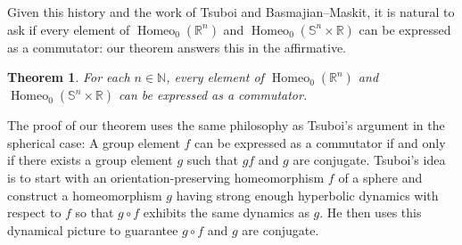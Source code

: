 \documentclass[microtype]{gtpart}
\newcommand{\br}{\mathbb{R}}
\newcommand{\bn}{\mathbb N}
\DeclareMathOperator{\Homeo}{Homeo}
\newtheorem*{MainThm1}{Theorem}
\newtheorem{Cor*}{Corollary}
\theoremstyle{definition}
\numberwithin{equation}{section}
\newcommand{\nv}[1]{\color{Cerulean}  \{NV: #1\}\color{black}}
\newcommand{\mb}[1]{\color{BrickRed} \{MB: #1\}\color{black}}
\begin{document}
Given this history and  the work of Tsuboi and Basmajian--Maskit, it is natural to ask if every element of \( \Homeo_0(\br^n) \) and \( \Homeo_0(\mathbb S^n \times \br) \) can be expressed as a commutator: our theorem answers this in the affirmative.

\begin{MainThm1}
For each \( n \in \bn \), every element of \( \Homeo_0(\mathbb R^n) \) and \( \Homeo_0(\mathbb S^n \times \br) \) can be expressed as a commutator. 
\end{MainThm1}

The proof of our theorem uses the same philosophy as Tsuboi's argument in the spherical case: 
A group element \( f \) can be expressed as a commutator if and only if there exists a group element \( g \) such that \( gf \) and \( g \) are conjugate. 
Tsuboi's idea is to start with an orientation-preserving homeomorphism \( f \) of a sphere and construct a homeomorphism \( g \) having strong enough hyperbolic dynamics with respect to \( f \) so that \( g\circ f \) exhibits the same dynamics as \( g \).
He then uses this dynamical picture to guarantee \( g\circ f \) and \( g \) are conjugate.

%
%
\end{document}
